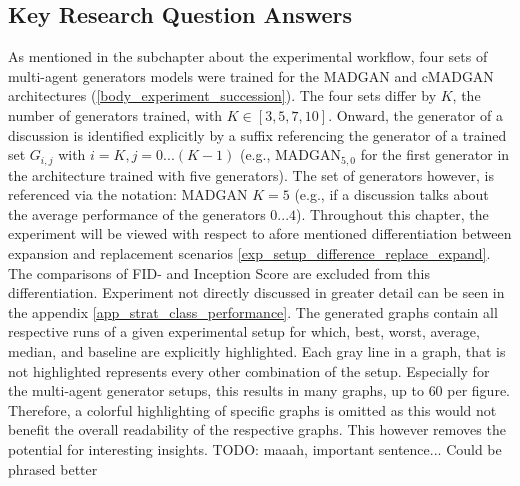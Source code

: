 \subsection{Key Research Question Answers}
As mentioned in the subchapter about the experimental workflow, four sets of multi-agent generators models were trained  for the MADGAN and cMADGAN architectures (\ref{body_experiment_succession}). The four sets differ by \(K\), the number of generators trained, with \(K \in [3, 5, 7, 10]\). Onward, the generator of a discussion is identified explicitly by a suffix referencing the generator of a trained set \(G_{i, j}\) with \(i=K, j=0...(K-1)\) (e.g., \(\text{MADGAN}_{5, 0}\) for the first generator in the architecture trained with five generators). The set of generators however, is referenced via the notation: MADGAN \(K=5\) (e.g., if a discussion talks about the average performance of the generators \(0...4\)). Throughout this chapter, the experiment will be viewed with respect to afore mentioned differentiation between expansion and replacement scenarios \ref{exp_setup_difference_replace_expand}. The comparisons of FID- and Inception Score are excluded from this differentiation. Experiment not directly discussed in greater detail can be seen in the appendix \ref{app_strat_class_performance}.
The generated graphs contain all respective runs of a given experimental setup for which, best, worst, average, median, and baseline are explicitly highlighted. Each gray line in a graph, that is not highlighted represents every other combination of the setup. Especially for the multi-agent generator setups, this results in many graphs, up to $60$ per figure. Therefore, a colorful highlighting of specific graphs is omitted as this would not benefit the overall readability of the respective graphs. This however removes the potential for interesting insights. TODO: maaah, important sentence... Could be phrased better


